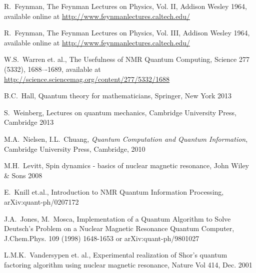 \documentclass[a4paper, draft]{article}
\theoremstyle{own}
\theoremstyle{remark}
\begin{document}
\begin{thebibliography}{9}


R.~Feynman,
The Feynman Lectures on Physics, Vol. II, Addison Wesley 1964, available online at \url{http://www.feynmanlectures.caltech.edu/}


R.~Feynman,
The Feynman Lectures on Physics, Vol. III, Addison Wesley 1964, available online at \url{http://www.feynmanlectures.caltech.edu/}


W.S.~Warren et. al., 
The Usefulness of NMR Quantum Computing, Science 277 (5332), 1688–-1689, available at \url{http://science.sciencemag.org/content/277/5332/1688}

B.C.~Hall, Quantum theory for mathematicians, Springer, New York 2013

S.~Weinberg, Lectures on quantum mechanics, Cambridge University Press, Cambridge 2013

M.A.~Nielsen, I.L.~Chuang, \emph{Quantum Computation and Quantum Information},
Cambridge University Press, Cambridge, 2010


M.H.~Levitt, Spin dynamics - basics of nuclear magnetic resonance, John Wiley \& Sons 2008

E.~Knill et.al., 
Introduction to NMR Quantum Information Processing,
arXiv:quant-ph/0207172

J.A.~Jones, M.~Mosca,
Implementation of a Quantum Algorithm to Solve Deutsch's Problem on a Nuclear Magnetic
Resonance Quantum Computer, J.Chem.Phys. 109 (1998) 1648-1653 or arXiv:quant-ph/9801027

L.M.K.~Vandersypen et. al.,
Experimental realization of Shor's quantum factoring algorithm using nuclear magnetic resonance, Nature Vol 414, Dec. 2001

\end{thebibliography}
\end{document}
